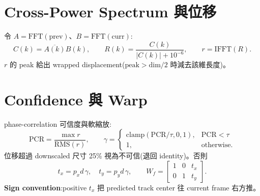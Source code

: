 \section{Cross-Power Spectrum 與位移}\label{sec:gmc-cps}
令 \(A=\mathrm{FFT}(\text{prev})\)、\(B=\mathrm{FFT}(\text{curr})\):
\begin{equation}\label{eq:gmc-cps}
  C(k)=\overline{A(k)}B(k),\qquad
  R(k)=\frac{C(k)}{|C(k)|+10^{-6}},\qquad
  r=\mathrm{IFFT}(R).
\end{equation}
\(r\) 的 peak 給出 wrapped displacement(\(\text{peak}>\text{dim}/2\) 時減去該維長度)。

\section{Confidence 與 Warp}\label{sec:gmc-warp}
phase-correlation 可信度與軟縮放:
\begin{equation}\label{eq:gmc-pcr}
  \mathrm{PCR}=\frac{\max r}{\mathrm{RMS}(r)},\qquad
  \gamma=\begin{cases}\mathrm{clamp}(\mathrm{PCR}/\tau,0,1),&\mathrm{PCR}<\tau\\1,&\text{otherwise.}\end{cases}
\end{equation}
位移超過 downscaled 尺寸 25\% 視為不可信(退回 identity)。否則
\begin{equation}\label{eq:gmc-final}
  t_x=p_x d\,\gamma,\quad t_y=p_y d\,\gamma,\qquad
  W_f=\begin{bmatrix}1&0&t_x\\0&1&t_y\end{bmatrix}.
\end{equation}
\textbf{Sign convention}:positive \(t_x\) 把 predicted track center 往
current frame 右方推。


